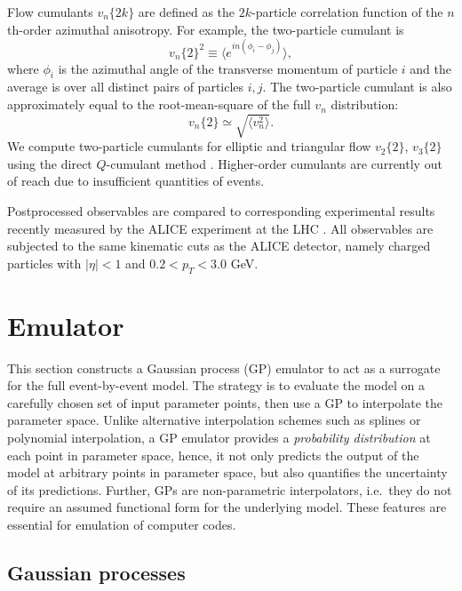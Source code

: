 \documentclass[aps,prc,reprint,superscriptaddress,amsmath]{revtex4-1}
\newcommand{\avg}[1]{\langle #1 \rangle}
\newcommand{\vnk}[2]{v_#1\{#2\}}
\begin{document}
Flow cumulants $\vnk n {2k}$ are defined as the $2k$-particle correlation function of the $n$th-order azimuthal anisotropy.
For example, the two-particle cumulant is
\begin{equation}
  \vnk n 2^2 \equiv \bigl\langle e^{in(\phi_i - \phi_j)} \bigr\rangle,
\end{equation}
where $\phi_i$ is the azimuthal angle of the transverse momentum of particle $i$ and the average is over all distinct pairs of particles $i,j$.
The two-particle cumulant is also approximately equal to the root-mean-square of the full $v_n$ distribution:
\begin{equation}
  \vnk n 2 \simeq \sqrt{\avg{v_n^2}}.
\end{equation}
We compute two-particle cumulants for elliptic and triangular flow $\vnk 2 2$, $\vnk 3 2$ using the direct $Q$-cumulant method \cite{Bilandzic:2010jr}.
Higher-order cumulants are currently out of reach due to insufficient quantities of events.

Postprocessed observables are compared to corresponding experimental results recently measured by the ALICE experiment at the LHC \cite{Abelev:2014mda}.
All observables are subjected to the same kinematic cuts as the ALICE detector, namely charged particles with $|\eta| < 1$ and $0.2 < p_T < 3.0$ GeV.


\section{Emulator}

This section constructs a Gaussian process (GP) emulator to act as a surrogate for the full event-by-event model.
The strategy is to evaluate the model on a carefully chosen set of input parameter points, then use a GP to interpolate the parameter space.
Unlike alternative interpolation schemes such as splines or polynomial interpolation, a GP emulator provides a \emph{probability distribution} at each point in parameter space, hence, it not only predicts the output of the model at arbitrary points in parameter space, but also quantifies the uncertainty of its predictions.
Further, GPs are non-parametric interpolators, i.e.\ they do not require an assumed functional form for the underlying model.
These features are essential for emulation of computer codes.

\subsection{Gaussian processes}
\end{document}

